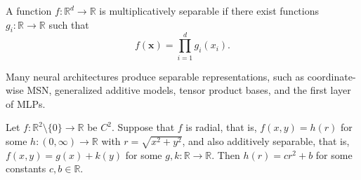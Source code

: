 \documentclass[twoside,11pt]{article}
\newcommand{\R}{\mathbb{R}}
\newcommand{\bx}{\bm{x}}
\begin{document}
\begin{definition}
	A function $f: \R^d \to \R$ is multiplicatively separable if there exist functions $g_i: \R \to \R$ such that
	\begin{equation}
		f(\bx) = \prod_{i=1}^d g_i(x_i).
		\label{eq:multiplicative_separable}
	\end{equation}
\end{definition}

Many neural architectures produce separable representations, such as coordinate-wise MSN, generalized additive models, tensor product bases, and the first layer of MLPs.

\begin{theorem}
	\label{thm:separability}
	Let $f: \R^2 \setminus \{0\} \to \R$ be $C^2$. Suppose that $f$ is radial, that is, $f(x, y) = h(r)$ for some $h: (0, \infty) \to \R$ with $r = \sqrt{x^2 + y^2}$, and also additively separable, that is, $f(x, y) = g(x) + k(y)$ for some $g, k: \R \to \R$.
	Then $h(r) = cr^2 + b$ for some constants $c, b \in \R$.
\end{theorem}
\end{document}
